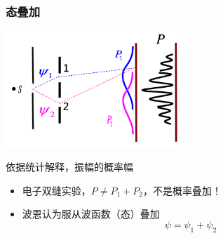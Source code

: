 \begin{frame}
    \frametitle{态叠加}
    \begin{center}
        \includegraphics[width=0.5\textwidth]{figs/sup-3.png} \\
    \end{center} 
    依据统计解释，振幅的概率幅\\
    \begin{itemize}
        \item 电子双缝实验，$P\neq P_1+P_2 $，不是概率叠加！
        \item 波恩认为服从波函数（态）叠加
        $$ \psi =\psi_1+\psi_2$$
    \end{itemize}
\end{frame} 


